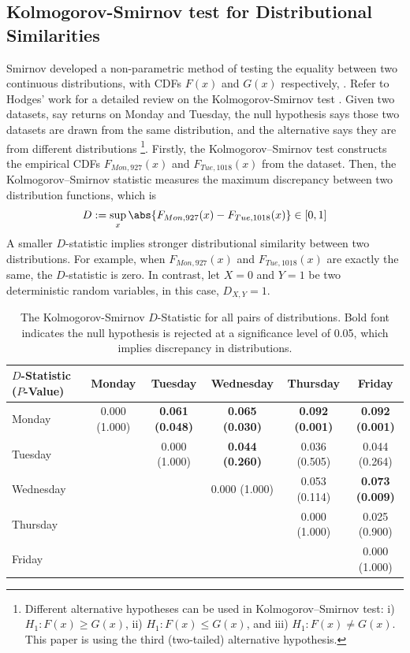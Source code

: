 \documentclass[12pt]{article}
\begin{document}
	\subsection{Kolmogorov-Smirnov test for Distributional Similarities}
	\par Smirnov developed a non-parametric method of testing the equality between two continuous distributions, with CDFs $F(x)$ and $G(x)$ respectively, \cite{Smirnov1939}. Refer to Hodges' work for a detailed review on the Kolmogorov-Smirnov test \cite{Hodges1957}. Given two datasets, say returns on Monday and Tuesday, the null hypothesis says those two datasets are drawn from the same distribution, and the alternative says they are from different distributions \footnote{Different alternative hypotheses can be used in Kolmogorov–Smirnov test: i) $H_1: F(x) \geq G(x)$, ii) $H_1: F(x) \leq G(x)$, and iii) $H_1: F(x) \neq G(x)$. This paper is using the third (two-tailed) alternative hypothesis.}.
	Firstly, the Kolmogorov–Smirnov test constructs the empirical CDFs $F_{Mon, 927}(x)$ and $F_{Tue, 1018}(x)$ from the dataset. Then, the Kolmogorov–Smirnov statistic measures the maximum discrepancy between two distribution functions, which is
	\begin{align}
		D := \sup_x \abs{F_{Mon, 927}(x) - F_{Tue, 1018}(x)} \in [0, 1]
	\end{align}
	A smaller $D$-statistic implies stronger distributional similarity between two distributions. For example, when $F_{Mon, 927}(x)$ and $F_{Tue, 1018}(x)$ are exactly the same, the $D$-statistic is zero. In contrast, let $X=0$ and $Y=1$ be two deterministic random variables, in this case, $D_{X, Y} = 1$.
	\begin{table}[H]
		\small
		\center
		\begin{tabular}{|l|c|c|c|c|c|}
			\hline
			$D$-Statistic ($P$-Value)& Monday & Tuesday & Wednesday & Thursday & Friday \\
			\hline 
			Monday    & 0.000 (1.000) & \textbf{0.061 (0.048)} & \textbf{0.065 (0.030)} & \textbf{0.092 (0.001)} & \textbf{0.092 (0.001)} \\
			Tuesday   &               & 0.000 (1.000) & \textbf{0.044 (0.260)} & 0.036 (0.505) & 0.044 (0.264) \\
			Wednesday &               &               & 0.000 (1.000) & 0.053 (0.114) & \textbf{0.073 (0.009)} \\
			Thursday  &               &               &               & 0.000 (1.000) & 0.025 (0.900) \\
			Friday    &               &               &               &               & 0.000 (1.000) \\
			\hline
		\end{tabular}
		\caption{The Kolmogorov-Smirnov $D$-Statistic for all pairs of distributions. Bold font indicates the null hypothesis is rejected at a significance level of 0.05, which implies discrepancy in distributions.}
	\end{table}
\end{document}
